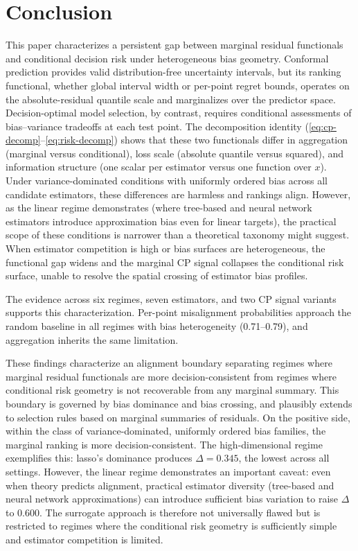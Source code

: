 \documentclass[a4paper,11pt]{article}
\begin{document}
\section{Conclusion}
\label{sec:conclusion}

This paper characterizes a persistent gap between marginal residual functionals and conditional decision risk under heterogeneous bias geometry. Conformal prediction provides valid distribution-free uncertainty intervals, but its ranking functional, whether global interval width or per-point regret bounds, operates on the absolute-residual quantile scale and marginalizes over the predictor space. Decision-optimal model selection, by contrast, requires conditional assessments of bias--variance tradeoffs at each test point. The decomposition identity (\eqref{eq:cp-decomp}--\eqref{eq:risk-decomp}) shows that these two functionals differ in aggregation (marginal versus conditional), loss scale (absolute quantile versus squared), and information structure (one scalar per estimator versus one function over $x$). Under variance-dominated conditions with uniformly ordered bias across all candidate estimators, these differences are harmless and rankings align. However, as the linear regime demonstrates (where tree-based and neural network estimators introduce approximation bias even for linear targets), the practical scope of these conditions is narrower than a theoretical taxonomy might suggest. When estimator competition is high or bias surfaces are heterogeneous, the functional gap widens and the marginal CP signal collapses the conditional risk surface, unable to resolve the spatial crossing of estimator bias profiles.

The evidence across six regimes, seven estimators, and two CP signal variants supports this characterization. Per-point misalignment probabilities approach the random baseline in all regimes with bias heterogeneity (0.71--0.79), and aggregation inherits the same limitation.

These findings characterize an alignment boundary separating regimes where marginal residual functionals are more decision-consistent from regimes where conditional risk geometry is not recoverable from any marginal summary. This boundary is governed by bias dominance and bias crossing, and plausibly extends to selection rules based on marginal summaries of residuals. On the positive side, within the class of variance-dominated, uniformly ordered bias families, the marginal ranking is more decision-consistent. The high-dimensional regime exemplifies this: lasso's dominance produces $\Delta = 0.345$, the lowest across all settings. However, the linear regime demonstrates an important caveat: even when theory predicts alignment, practical estimator diversity (tree-based and neural network approximations) can introduce sufficient bias variation to raise $\Delta$ to 0.600. The surrogate approach is therefore not universally flawed but is restricted to regimes where the conditional risk geometry is sufficiently simple and estimator competition is limited.
\end{document}
